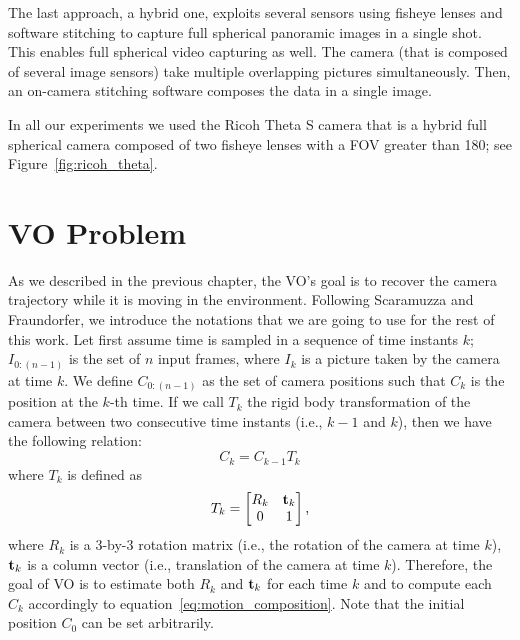 The last approach, a hybrid one, exploits several sensors using fisheye lenses and software stitching to capture full spherical panoramic images in a single shot. This enables full spherical video capturing as well. The camera (that is composed of several image sensors) take multiple overlapping pictures simultaneously. Then, an on-camera stitching software composes the data in a single image.

In all our experiments we used the Ricoh Theta S camera that is a hybrid full spherical camera composed of two fisheye lenses with a FOV greater than 180\degree; see Figure~\ref{fig:ricoh_theta}.
%
%

\section{VO Problem}
\label{sec:vo_problem}
As we described in the previous chapter, the VO's goal is to recover the 
camera trajectory while it is moving in the environment. Following Scaramuzza and Fraundorfer\cite{scaramuzzaVisualOdometryI},
we introduce the notations that we are going to use for the rest of this work.
%
Let first assume time is sampled in a sequence of time instants \(k\); 
\(I_{0:(n - 1)} \) is the set of $n$ input frames, where \(I_{k}\) is a picture taken by 
the camera at time \(k\). We define \(C_{0:(n-1)}\) as the set of camera 
positions such that \(C_k\) is the position at the \(k\)-th time.
If we call \(T_k\) the rigid body transformation of the camera between two
consecutive time instants (i.e., $k-1$ and $k$), then we have the following relation:
%
\begin{equation}
	C_k = C_{k-1} T_k
	\label{eq:motion_composition}
\end{equation}
%
\noindent where \(T_k\) is defined as
%
\begin{equation*}
	T_k =
	\begin{bmatrix}
	R_k & \mathbf{t}_k \\
	0 & 1
	\end{bmatrix} \text{,}
\end{equation*}
%
\noindent where $R_k$ is a 3-by-3 rotation matrix (i.e., the rotation of the camera at time $k$),
$\mathbf{t}_k$ is a column vector (i.e., translation of the camera at time $k$).
Therefore, the goal of VO is to estimate both $R_k$ and $\mathbf{t}_k$ for each time 
$k$ and to compute each $C_k$ accordingly to equation~\ref{eq:motion_composition}. Note that the initial position $C_0$ can be set arbitrarily.


